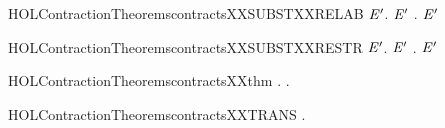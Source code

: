 \newcommand{\HOLContractionTheoremscontractsXXSUBSTXXPREFIX}{\UseVerbatim{HOLContractionTheoremscontractsXXSUBSTXXPREFIX}}
\begin{SaveVerbatim}{HOLContractionTheoremscontractsXXSUBSTXXRELAB}
\HOLTokenTurnstile{} \HOLSymConst{\HOLTokenForall{}} \ensuremath{\HOLBoundVar{E}\sp{\prime}}.   \ensuremath{\HOLBoundVar{E}\sp{\prime}} \HOLSymConst{\HOLTokenImp{}} \HOLSymConst{\HOLTokenForall{}}.      \ensuremath{\HOLBoundVar{E}\sp{\prime}} 
\end{SaveVerbatim}
\newcommand{\HOLContractionTheoremscontractsXXSUBSTXXRELAB}{\UseVerbatim{HOLContractionTheoremscontractsXXSUBSTXXRELAB}}
\begin{SaveVerbatim}{HOLContractionTheoremscontractsXXSUBSTXXRESTR}
\HOLTokenTurnstile{} \HOLSymConst{\HOLTokenForall{}} \ensuremath{\HOLBoundVar{E}\sp{\prime}}.   \ensuremath{\HOLBoundVar{E}\sp{\prime}} \HOLSymConst{\HOLTokenImp{}} \HOLSymConst{\HOLTokenForall{}}.       \ensuremath{\HOLBoundVar{E}\sp{\prime}}
\end{SaveVerbatim}
\newcommand{\HOLContractionTheoremscontractsXXSUBSTXXRESTR}{\UseVerbatim{HOLContractionTheoremscontractsXXSUBSTXXRESTR}}
\begin{SaveVerbatim}{HOLContractionTheoremscontractsXXthm}
\HOLTokenTurnstile{} \HOLSymConst{\HOLTokenForall{}} .    \HOLSymConst{\HOLTokenEquiv{}} \HOLSymConst{\HOLTokenExists{}}.    \HOLSymConst{\HOLTokenConj{}}  
\end{SaveVerbatim}
\newcommand{\HOLContractionTheoremscontractsXXthm}{\UseVerbatim{HOLContractionTheoremscontractsXXthm}}
\begin{SaveVerbatim}{HOLContractionTheoremscontractsXXTRANS}
\HOLTokenTurnstile{} \HOLSymConst{\HOLTokenForall{}}  .    \HOLSymConst{\HOLTokenConj{}}    \HOLSymConst{\HOLTokenImp{}}   
\end{SaveVerbatim}
\newcommand{\HOLContractionTheoremscontractsXXTRANS}{\UseVerbatim{HOLContractionTheoremscontractsXXTRANS}}
